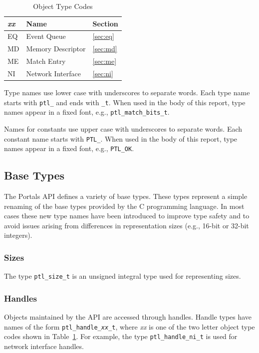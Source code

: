 \documentclass{sand-report}
\begin{document}
\begin{table}[htbp]
  \caption{Object Type Codes}\label{tab:objcodes}
  \medskip
  \begin{center}\small
    \begin{tabular}{lll}
      \emph{xx} & Name & Section \\ \hline
      EQ & Event Queue       & \ref{sec:eq} \\
      MD & Memory Descriptor & \ref{sec:md} \\
      ME & Match Entry       & \ref{sec:me} \\
      NI & Network Interface & \ref{sec:ni} \\
    \end{tabular}
  \end{center}
\end{table}

Type names use lower case with underscores to separate words.  Each
type name starts with \texttt{ptl_} and ends with \texttt{_t}.  When
used in the body of this report, type names appear in a fixed font,
e.g., \texttt{ptl_match_bits_t}.

Names for constants use upper case with underscores to separate words.
Each constant name starts with \texttt{PTL_}.  When used in the body
of this report, type names appear in a fixed font, e.g.,
\texttt{PTL_OK}.

\subsection{Base Types}

The Portals API defines a variety of base types.  These types
represent a simple renaming of the base types provided by the C
programming language.  In most cases these new type names have been
introduced to improve type safety and to avoid issues arising from
differences in representation sizes (e.g., 16-bit or 32-bit integers).

\subsubsection{Sizes}\label{sec:size-t}
The type \texttt{ptl_size_t} is an unsigned integral type used for
representing sizes.

\subsubsection{Handles}\label{sec:handle-type}
Objects maintained by the API are accessed through handles.  Handle
types have names of the form \texttt{ptl_handle_\emph{xx}_t}, where
\emph{xx} is one of the two letter object type codes shown in
Table~\ref{tab:objcodes}.  For example, the type
\texttt{ptl_handle_ni_t} is used for network interface handles.
\end{document}
